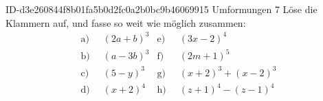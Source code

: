 \begin{exercise}
      {ID-d3e260844f8b01fa5b0d2fc0a2b0bc9b46069915}
      {Umformungen 7}
  \ifproblem\problem
    \newcommand{\gap}{\;\;}%
    Löse die Klammern auf, und fasse so weit wie möglich zusammen:
    \begin{align*}
      \text{a)}\gap & (2a+b)^3 &
      \text{e)}\gap & (3x-2)^4
      \\
      \text{b)}\gap & (a-3b)^3 &
      \text{f)}\gap & (2m+1)^5
      \\
      \text{c)}\gap & (5-y)^3 &
      \text{g)}\gap & (x+2)^3+(x-2)^3
      \\
      \text{d)}\gap & (x+2)^4 &
      \text{h)}\gap & (z+1)^4-(z-1)^4
    \end{align*}
  \fi
\end{exercise}
